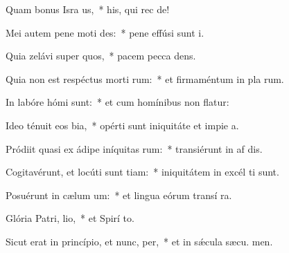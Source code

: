\item Quam bonus Isra us,~* his, qui rec  de!
\item Mei autem pene moti  des:~* pene effúsi sunt  i.
\item Quia zelávi super quos,~* pacem pecca dens.
\item Quia non est respéctus morti rum:~* et firmaméntum in pla rum.
\item In labóre hómi  sunt:~* et cum homínibus non flatur:
\item Ideo ténuit eos bia,~* opérti sunt iniquitáte et impie a.
\item Pródiit quasi ex ádipe iníquitas rum:~* transiérunt in af dis.
\item Cogitavérunt, et locúti sunt tiam:~* iniquitátem in excél ti sunt.
\item Posuérunt in cælum  um:~* et lingua eórum transí  ra.
\item Glória Patri,  lio,~* et Spirí to.
\item Sicut erat in princípio, et nunc,  per,~* et in sǽcula sæcu. men.
